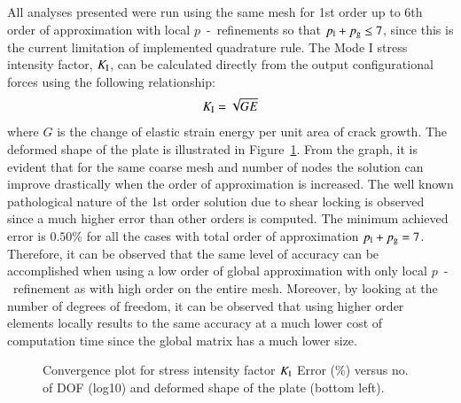 \documentclass[11pt]{acmeArticle}
\numberwithin{equation}{section}
\begin{document}
All analyses presented were run using the same mesh for 1st order up to 6th order of approximation with local $p$~-~refinements so that $p_{\rm l} + p_{\rm g} \leq 7$, since this is the current limitation of implemented quadrature rule. 
The Mode I stress intensity factor, $K_{\rm I}$, can be calculated directly from the output configurational forces using the following relationship: 
\begin{equation}
K_{\rm I} = \sqrt{GE}
\end{equation}
where $G$ is the change of elastic strain energy per unit area of crack growth.
The deformed shape of the plate is illustrated in Figure~\ref{fig:plate_conv_no_sing}.
From the graph, it is evident that for the same coarse mesh and number of nodes the solution can improve drastically when the order of approximation is increased. 
The well known pathological nature of the 1st order solution due to shear locking is observed since a much higher error than other orders is computed. 
The minimum achieved error is $0.50\%$ for all the cases with total order of approximation  $p_{\rm l} + p_{\rm g} = 7$. 
Therefore, it can be observed that the same level of accuracy can be accomplished when using a low order of global approximation with only local $p$~-~refinement as with high order on the entire mesh. 
Moreover, by looking at the number of degrees of freedom, it can be observed that using higher order elements locally results to the same accuracy at a much lower cost of computation time since the global matrix has a much lower size.
\begin{figure}
	\centering
	\caption{Convergence plot for stress intensity factor $K_{\rm I}$ Error (\%) versus no. of DOF (log10) and deformed shape of the plate (bottom left).}
	\label{fig:plate_conv_no_sing}
\end{figure}
\end{document}
